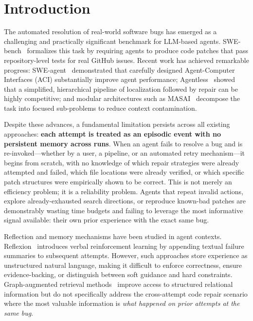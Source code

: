 \documentclass{article}
\begin{document}
\section{Introduction}

The automated resolution of real-world software bugs has emerged as a challenging and practically significant benchmark for LLM-based agents. SWE-bench~\cite{jimenez2024swebench} formalizes this task by requiring agents to produce code patches that pass repository-level tests for real GitHub issues. Recent work has achieved remarkable progress: SWE-agent~\cite{yang2024sweagent} demonstrated that carefully designed Agent-Computer Interfaces (ACI) substantially improve agent performance; Agentless~\cite{xia2024agentless} showed that a simplified, hierarchical pipeline of localization followed by repair can be highly competitive; and modular architectures such as MASAI~\cite{arora2024masai} decompose the task into focused sub-problems to reduce context contamination.

Despite these advances, a fundamental limitation persists across all existing approaches: \textbf{each attempt is treated as an episodic event with no persistent memory across runs}. When an agent fails to resolve a bug and is re-invoked---whether by a user, a pipeline, or an automated retry mechanism---it begins from scratch, with no knowledge of which repair strategies were already attempted and failed, which file locations were already verified, or which specific patch structures were empirically shown to be correct. This is not merely an efficiency problem; it is a reliability problem. Agents that repeat invalid actions, explore already-exhausted search directions, or reproduce known-bad patches are demonstrably wasting time budgets and failing to leverage the most informative signal available: their own prior experience with the exact same bug.

Reflection and memory mechanisms have been studied in agent contexts. Reflexion~\cite{shinn2023reflexion} introduces verbal reinforcement learning by appending textual failure summaries to subsequent attempts. However, such approaches store experience as unstructured natural language, making it difficult to enforce correctness, ensure evidence-backing, or distinguish between soft guidance and hard constraints. Graph-augmented retrieval methods~\cite{han2024graphrag} improve access to structured relational information but do not specifically address the cross-attempt code repair scenario where the most valuable information is \emph{what happened on prior attempts at the same bug}.
\end{document}
